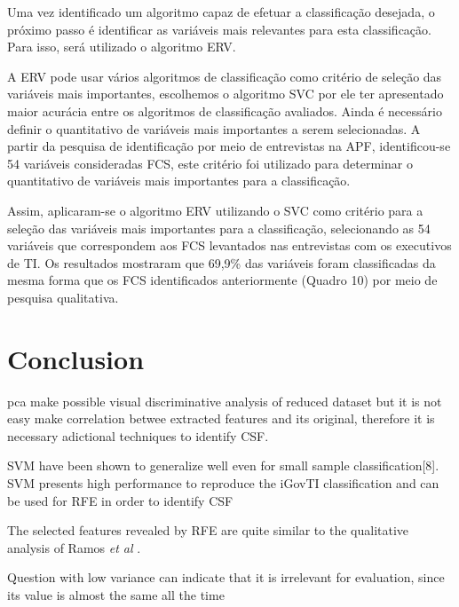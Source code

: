 Uma vez identificado um algoritmo capaz de efetuar a classificação desejada, o próximo passo é identificar as variáveis mais relevantes para esta classificação. Para isso, será utilizado o algoritmo ERV. 

A ERV pode usar vários algoritmos de classificação como critério de seleção das variáveis mais importantes, escolhemos o algoritmo SVC por ele ter apresentado maior acurácia entre os algoritmos de classificação avaliados. Ainda é necessário definir o quantitativo de variáveis mais importantes a serem selecionadas. A partir da pesquisa de identificação por meio de entrevistas na APF, identificou-se 54 variáveis consideradas FCS, este critério foi utilizado para determinar o quantitativo de variáveis mais importantes para a classificação.

Assim, aplicaram-se o algoritmo ERV utilizando o SVC como critério para a seleção das variáveis mais importantes para a classificação, selecionando as 54 variáveis que correspondem aos FCS levantados nas entrevistas com os executivos de TI. Os resultados mostraram que 69,9\% das variáveis foram classificadas da mesma forma que os FCS identificados anteriormente (Quadro 10) por meio de pesquisa qualitativa.

\section{Conclusion}
\label{sec:ch2_conclusion}

pca make possible visual discriminative analysis of reduced dataset but it is not easy make correlation betwee extracted features and its original, therefore it is necessary adictional techniques to identify CSF.

SVM have been shown to generalize well even for small sample classification[8]. SVM presents high performance to reproduce the iGovTI classification and can be used for RFE in order to identify CSF

The selected features revealed by RFE are quite similar to the qualitative analysis of Ramos \emph{et al} \cite{ramos2016information}.

Question with low variance can indicate that it is irrelevant for evaluation, since its value is almost the same all the time